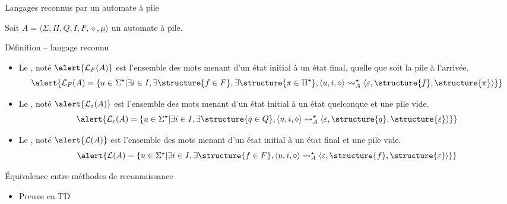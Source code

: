 \begin{frame}{Langages reconnus par un automate à pile}
  \small
  
  Soit $A=\langle \Sigma, \Pi, Q, I, F, \diamond, \mu \rangle$ un automate à pile.

  \begin{block}{Définition -- langage reconnu}
    \begin{itemize}
    \item\vspace{-1mm} Le , noté $\alert{\mathcal{L}_F(A)}$ est l'ensemble des mots menant d'un état initial à un état final, quelle que soit la pile à l'arrivée. 
      $$\alert{\mathcal{L}_F(A) = \{u \in \Sigma^\star | \exists i\in I, \exists \structure{f\in F}, \exists \structure{\pi\in\Pi^\star}, \langle u, i, \diamond \rangle \leadsto_A^\star \langle \varepsilon, \structure{f}, \structure{\pi} \rangle\}}$$
    \item\vspace{-1mm} Le , noté $\alert{\mathcal{L}_\varepsilon(A)}$ est l'ensemble des mots menant d'un état initial à un état quelconque et une pile vide. 
      $$
      \alert{\mathcal{L}_\varepsilon(A) = \{u \in \Sigma^\star | \exists i\in I, \exists \structure{q\in Q}, \langle u, i, \diamond \rangle \leadsto_A^\star \langle \varepsilon, \structure{q}, \structure{\varepsilon} \rangle\}}
      $$
    \item\vspace{-1mm} Le , noté $\alert{\mathcal{L}(A)}$ est l'ensemble des mots menant d'un état initial à un état final et une pile vide. 
      $$
      \alert{\mathcal{L}(A) = \{u \in \Sigma^\star | \exists i\in I, \exists \structure{f\in F}, \langle u, i, \diamond \rangle \leadsto_A^\star \langle \varepsilon, \structure{f}, \structure{\varepsilon} \rangle\}}
      $$
    \end{itemize}
  \end{block}

  \vspace{-2mm}
  \begin{block}{Équivalence entre méthodes de reconnaissance}
    \begin{itemize}
    \item \vspace{-2mm}Preuve en TD
    \end{itemize}
  \end{block}
  
\end{frame}

